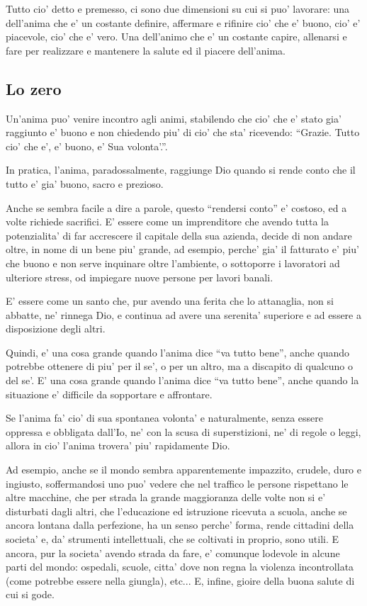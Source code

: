 Tutto cio' detto e premesso, ci sono due dimensioni su cui si puo' lavorare: una dell'anima che e' un costante definire, affermare e rifinire cio' che e' buono, cio' e' piacevole, cio' che e' vero. Una dell'animo che e' un costante capire, allenarsi e fare per realizzare e mantenere la salute ed il piacere dell'anima.

\subsection{Lo zero}
\label{loZero}
Un'anima puo' venire incontro agli animi, stabilendo che cio' che e' stato gia' raggiunto e' buono e non chiedendo piu' di cio' che sta' ricevendo: ``Grazie. Tutto cio' che e', e' buono, e' Sua volonta'.''.

In pratica, l'anima, paradossalmente, raggiunge Dio quando si rende conto che il tutto e' gia' buono, sacro e prezioso.

Anche se sembra facile a dire a parole, questo ``rendersi conto'' e' costoso, ed a volte richiede sacrifici. E' essere come un imprenditore che avendo tutta la potenzialita' di far accrescere il capitale della sua azienda, decide di non andare oltre, in nome di un bene piu' grande, ad esempio, perche' gia' il fatturato e' piu' che buono e non serve inquinare oltre l'ambiente, o sottoporre i lavoratori ad ulteriore stress, od impiegare nuove persone per lavori banali.

E' essere come un santo che, pur avendo una ferita che lo attanaglia, non si abbatte, ne' rinnega Dio, e continua ad avere una serenita' superiore e ad essere a disposizione degli altri.

Quindi, e' una cosa grande quando l'anima dice ``va tutto bene'', anche quando potrebbe ottenere di piu' per il se', o per un altro, ma a discapito di qualcuno o del se'. E' una cosa grande quando l'anima dice ``va tutto bene'', anche quando la situazione e' difficile da sopportare e affrontare.

Se l'anima fa' cio' di sua spontanea volonta' e naturalmente, senza essere oppressa e obbligata dall'Io, ne' con la scusa di superstizioni, ne' di regole o leggi, allora in cio' l'anima trovera' piu' rapidamente Dio.

Ad esempio, anche se il mondo sembra apparentemente impazzito, crudele, duro e ingiusto, soffermandosi uno puo' vedere che nel traffico le persone rispettano le altre macchine, che per strada la grande maggioranza delle volte non si e' disturbati dagli altri, che l'educazione ed istruzione ricevuta a scuola, anche se ancora lontana dalla perfezione, ha un senso perche' forma, rende cittadini della societa' e, da' strumenti intellettuali, che se coltivati in proprio, sono utili. E ancora, pur la societa' avendo strada da fare, e' comunque lodevole in alcune parti del mondo: ospedali, scuole, citta' dove non regna la violenza incontrollata (come potrebbe essere nella giungla), etc... E, infine, gioire della buona salute di cui si gode.

